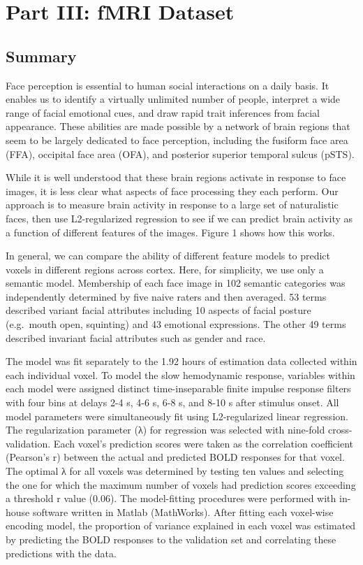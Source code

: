 \documentclass{article}
\begin{document}
    \section{Part III: fMRI Dataset}\label{part-iii-fmri-dataset}

\subsection{Summary}

Face perception is essential to human social interactions on a daily
basis. It enables us to identify a virtually unlimited number of people,
interpret a wide range of facial emotional cues, and draw rapid trait
inferences from facial appearance. These abilities are made possible by
a network of brain regions that seem to be largely dedicated to face
perception, including the fusiform face area (FFA), occipital face area
(OFA), and posterior superior temporal sulcus (pSTS).

While it is well understood that these brain regions activate in
response to face images, it is less clear what aspects of face
processing they each perform. Our approach is to measure brain activity
in response to a large set of naturalistic faces, then use
L2-regularized regression to see if we can predict brain activity as a
function of different features of the images. Figure 1 shows how this
works.

In general, we can compare the ability of different feature models to
predict voxels in different regions across cortex. Here, for simplicity,
we use only a semantic model. Membership of each face image in 102
semantic categories was independently determined by five naive raters
and then averaged. 53 terms described variant facial attributes
including 10 aspects of facial posture (e.g.~mouth open, squinting) and
43 emotional expressions. The other 49 terms described invariant facial
attributes such as gender and race.

The model was fit separately to the 1.92 hours of estimation data
collected within each individual voxel. To model the slow hemodynamic
response, variables within each model were assigned distinct
time-inseparable finite impulse response filters with four bins at
delays 2-4 s, 4-6 s, 6-8 s, and 8-10 s after stimulus onset. All model
parameters were simultaneously fit using L2-regularized linear
regression. The regularization parameter (λ) for regression was selected
with nine-fold cross-validation. Each voxel's prediction scores were
taken as the correlation coefficient (Pearson's r) between the actual
and predicted BOLD responses for that voxel. The optimal λ for all
voxels was determined by testing ten values and selecting the one for
which the maximum number of voxels had prediction scores exceeding a
threshold r value (0.06). The model-fitting procedures were performed
with in-house software written in Matlab (MathWorks). After fitting each
voxel-wise encoding model, the proportion of variance explained in each
voxel was estimated by predicting the BOLD responses to the validation
set and correlating these predictions with the data.
\end{document}
